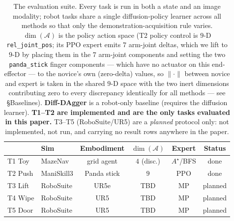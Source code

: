 \documentclass[letterpaper]{article} %
\begin{document}
\begin{table}[t]
\centering
\small
\caption{The evaluation suite. Every task is run in both a state and an image
modality; robot tasks share a single diffusion-policy learner across all
methods so that only the demonstration-acquisition rule varies. $\dim(\mathcal{A})$
is the policy action space (T2 policy control is $9$-D \texttt{rel\_joint\_pos};
its PPO expert emits $7$ arm-joint deltas, which we lift to $9$-D by placing them
in the $7$ arm-joint components and setting the two \texttt{panda\_stick} finger
components --- which have no actuator on this end-effector --- to the novice's own
(zero-delta) values, so $\|\cdot\|$ between novice and expert is taken in the
shared $9$-D space with the two inert dimensions contributing zero to every
discrepancy identically for all methods --- see
\S Baselines). \textbf{Diff-DAgger} is a robot-only baseline (requires the
diffusion learner). \textbf{T1--T2 are implemented and are the only tasks
evaluated in this paper.} T3--T5 (RoboSuite/UR5) are a \emph{planned} protocol
only: not implemented, not run, and carrying no result rows anywhere in the paper.}
\label{tab:tasks}
\begin{tabular}{llcccc}
\toprule
 & Sim & Embodiment & $\dim(\mathcal{A})$ & Expert & Status \\
\midrule
T1 Toy  & MazeNav          & grid agent    & $4$ (disc.) & $A^{\!\star}$/BFS & done \\
T2 Push & ManiSkill3       & Panda stick   & $9$         & PPO & done \\
T3 Lift & RoboSuite        & UR5e          & TBD & MP & planned \\
T4 Wipe & RoboSuite        & UR5           & TBD & MP & planned \\
T5 Door & RoboSuite        & UR5           & TBD & MP & planned \\
\bottomrule
\end{tabular}
\end{table}
\end{document}
